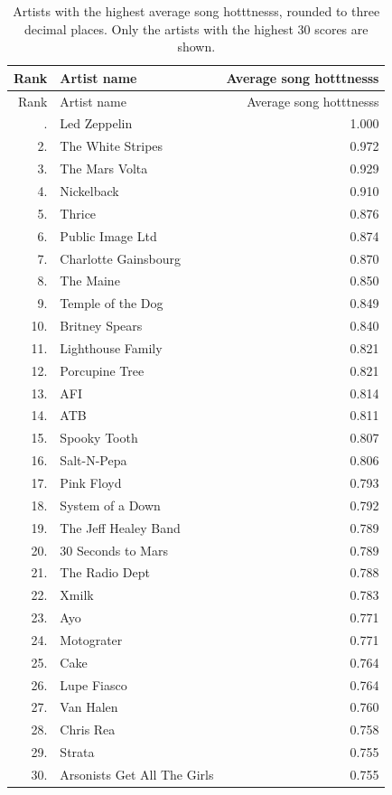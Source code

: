\documentclass[                                                             %
        12pt,                                                                   %
        twoside                                                                 %
    ]{scrartcl}                                                                 %
\begin{document}
{\footnotesize
\begin{longtabu}{r l r}
    \caption[Artists with the highest average song hotttnesss.]{%
        Artists with the highest average song hotttnesss, 
        rounded to three decimal places.
        Only the artists with the highest 30 scores are shown.
    }
    \label{tab:artists-highest-average-song-hotttnesss-b} \\ \toprule
    Rank & Artist name & Average song hotttnesss \\ \midrule
    \endfirsthead
    \toprule
    Rank & Artist name & Average song hotttnesss \\ \midrule
    \endhead
    \bottomrule
    . & Led Zeppelin                & 1.000 \\
	 2. & The White Stripes           & 0.972 \\
	 3. & The Mars Volta              & 0.929 \\
	 4. & Nickelback                  & 0.910 \\
	 5. & Thrice                      & 0.876 \\
	 6. & Public Image Ltd            & 0.874 \\
	 7. & Charlotte Gainsbourg        & 0.870 \\
	 8. & The Maine                   & 0.850 \\
	 9. & Temple of the Dog           & 0.849 \\
	10. & Britney Spears              & 0.840 \\
	11. & Lighthouse Family           & 0.821 \\
	12. & Porcupine Tree              & 0.821 \\
	13. & AFI                         & 0.814 \\
	14. & ATB                         & 0.811 \\
	15. & Spooky Tooth                & 0.807 \\
	16. & Salt-N-Pepa                 & 0.806 \\
	17. & Pink Floyd                  & 0.793 \\
	18. & System of a Down            & 0.792 \\
	19. & The Jeff Healey Band        & 0.789 \\
	20. & 30 Seconds to Mars          & 0.789 \\
	21. & The Radio Dept              & 0.788 \\
	22. & Xmilk                       & 0.783 \\
	23. & Ayo                         & 0.771 \\
	24. & Motograter                  & 0.771 \\
	25. & Cake                        & 0.764 \\
	26. & Lupe Fiasco                 & 0.764 \\
	27. & Van Halen                   & 0.760 \\
	28. & Chris Rea                   & 0.758 \\
	29. & Strata                      & 0.755 \\
	30. & Arsonists Get All The Girls & 0.755
\end{longtabu}
}
\end{document}
